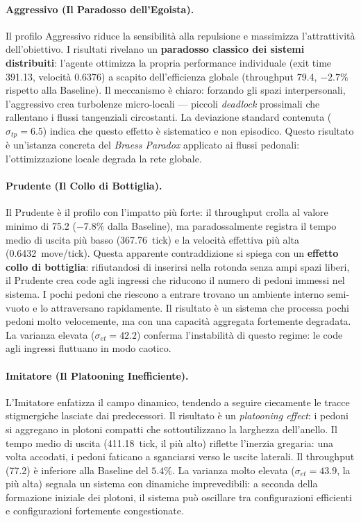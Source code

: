 \paragraph{Aggressivo (Il Paradosso dell'Egoista).}
Il profilo Aggressivo riduce la sensibilità alla repulsione e massimizza l'attrattività dell'obiettivo. I risultati rivelano un \textbf{paradosso classico dei sistemi distribuiti}: l'agente ottimizza la propria performance individuale (exit time 391.13, velocità 0.6376) a scapito dell'efficienza globale (throughput 79.4, $-2.7\%$ rispetto alla Baseline). Il meccanismo è chiaro: forzando gli spazi interpersonali, l'aggressivo crea turbolenze micro-locali --- piccoli \textit{deadlock} prossimali che rallentano i flussi tangenziali circostanti. La deviazione standard contenuta ($\sigma_{tp} = 6.5$) indica che questo effetto è sistematico e non episodico. Questo risultato è un'istanza concreta del \textit{Braess Paradox} applicato ai flussi pedonali: l'ottimizzazione locale degrada la rete globale.

\paragraph{Prudente (Il Collo di Bottiglia).}
Il Prudente è il profilo con l'impatto più forte: il throughput crolla al valore minimo di 75.2 ($-7.8\%$ dalla Baseline), ma paradossalmente registra il tempo medio di uscita più basso (367.76~tick) e la velocità effettiva più alta (0.6432~move/tick). Questa apparente contraddizione si spiega con un \textbf{effetto collo di bottiglia}: rifiutandosi di inserirsi nella rotonda senza ampi spazi liberi, il Prudente crea code agli ingressi che riducono il numero di pedoni immessi nel sistema. I pochi pedoni che riescono a entrare trovano un ambiente interno semi-vuoto e lo attraversano rapidamente. Il risultato è un sistema che processa pochi pedoni molto velocemente, ma con una capacità aggregata fortemente degradata. La varianza elevata ($\sigma_{et} = 42.2$) conferma l'instabilità di questo regime: le code agli ingressi fluttuano in modo caotico.

\paragraph{Imitatore (Il Platooning Inefficiente).}
L'Imitatore enfatizza il campo dinamico, tendendo a seguire ciecamente le tracce stigmergiche lasciate dai predecessori. Il risultato è un \textit{platooning effect}: i pedoni si aggregano in plotoni compatti che sottoutilizzano la larghezza dell'anello. Il tempo medio di uscita (411.18~tick, il più alto) riflette l'inerzia gregaria: una volta accodati, i pedoni faticano a sganciarsi verso le uscite laterali. Il throughput (77.2) è inferiore alla Baseline del $5.4\%$. La varianza molto elevata ($\sigma_{et} = 43.9$, la più alta) segnala un sistema con dinamiche imprevedibili: a seconda della formazione iniziale dei plotoni, il sistema può oscillare tra configurazioni efficienti e configurazioni fortemente congestionate.

